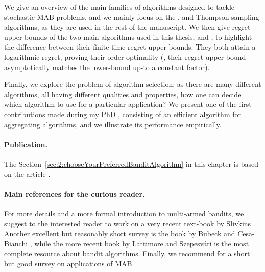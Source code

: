 We give an overview of the main families of algorithms designed to tackle stochastic MAB problems, and we mainly focus on the \UCB, \klUCB{} and Thompson sampling algorithms, as they are used in the rest of the manuscript.
%
We then give regret upper-bounds of the two main algorithms used in this thesis, \UCB{} and \klUCB, to highlight the difference between their finite-time regret upper-bounds. They both attain a logarithmic regret, proving their order optimality (\ie, their regret upper-bound asymptotically matches the lower-bound up-to a constant factor).

Finally, we explore the problem of algorithm selection: as there are many different algorithms, all having different qualities and properties, how one can decide which algorithm to use for a particular application?
We present one of the first contributions made during my PhD \cite{Besson2018WCNC}, consisting of an efficient algorithm for aggregating algorithms,
and we illustrate its performance empirically.


\paragraph{Publication.}
%
The Section~\ref{sec:2:chooseYourPreferredBanditAlgorithm} in this chapter is based on the article \cite{Besson2018WCNC}.


\paragraph{Main references for the curious reader.}
%
For more details and a more formal introduction to multi-armed bandits, we suggest to the interested reader to work on a very recent text-book by Slivkins \cite{Slivkins2019}.
Another excellent but reasonably short survey is the book by Bubeck and Cesa-Bianchi \cite{Bubeck12}, while the more recent book by Lattimore and Szepesv{\'a}ri \cite{LattimoreBanditAlgorithmsBook} is the most complete resource about bandit algorithms.
Finally, we recommend \cite{bouneffouf2019survey} for a short but good survey on applications of MAB.

